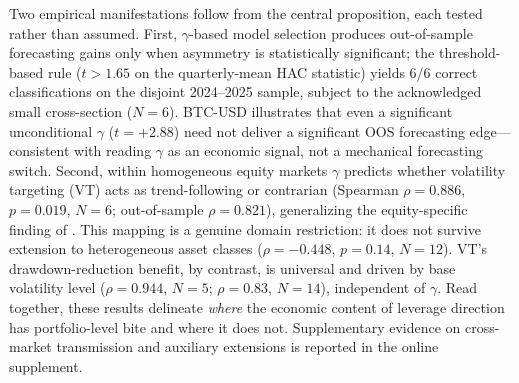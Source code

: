 Two empirical manifestations follow from the central proposition, each tested rather than assumed. First, $\gamma$-based model selection produces out-of-sample forecasting gains only when asymmetry is statistically significant; the threshold-based rule ($t > 1.65$ on the quarterly-mean HAC statistic) yields 6/6 correct classifications on the disjoint 2024--2025 sample, subject to the acknowledged small cross-section ($N = 6$). BTC-USD illustrates that even a significant unconditional $\gamma$ ($t = +2.88$) need not deliver a significant OOS forecasting edge---consistent with reading $\gamma$ as an economic signal, not a mechanical forecasting switch. Second, within homogeneous equity markets $\gamma$ predicts whether volatility targeting (VT) acts as trend-following or contrarian (Spearman $\rho = 0.886$, $p = 0.019$, $N = 6$; out-of-sample $\rho = 0.821$), generalizing the equity-specific finding of \citet{hood2025}. This mapping is a genuine domain restriction: it does not survive extension to heterogeneous asset classes ($\rho = -0.448$, $p = 0.14$, $N = 12$). VT's drawdown-reduction benefit, by contrast, is universal and driven by base volatility level ($\rho = 0.944$, $N = 5$; $\rho = 0.83$, $N = 14$), independent of $\gamma$. Read together, these results delineate \emph{where} the economic content of leverage direction has portfolio-level bite and where it does not. Supplementary evidence on cross-market transmission and auxiliary extensions is reported in the online supplement.
